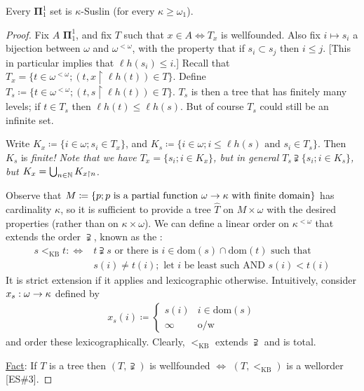 \documentclass[]{article}
\newcommand{\om}{\omega}
\newcommand{\lom}{{<\omega}}
\newcommand{\lh}{\ell h}
\newcommand{\bopi}{\bm{\Pi}}
\newcommand{\lkb}{<_{\textrm{KB}}}
\newcommand{\dom}{\textrm{dom}}
\begin{document}
\begin{theorem*}[Shoenfield]
    Every $\bopi^1_1$ set is $\kappa$-Suslin (for every $\kappa \ge \om_1$).
\end{theorem*}
\begin{proof}
    Fix $A$ $\bopi^1_1$, and fix $T$ such that $x \in A \iff T_x$ is wellfounded. Also fix $i \mapsto s_i$ a bijection between $\om$ and $\om^\lom$, with the property that if $s_i\subset s_j$ then $i\le j$. [This in particular implies that $\lh(s_i)\le i$.] Recall that $T_x = \{t \in \om^\lom; (t,x\restriction \lh(t))\in T\}$. Define $T_s \coloneqq \{t \in \om^\lom; (t,s\restriction \lh(t))\in T\}$. $T_s$ is then a tree that has finitely many levels; if $t\in T_s$ then $\lh(t)\le \lh(s)$. But of course $T_s$ could still be an infinite set.

    Write $K_x \coloneqq \{i \in \om; s_i \in T_x\}$, and $K_s \coloneqq \{i\in \om; i\le \lh(s)\textrm{ and }s_i \in T_s\}$. Then $K_s$ is \it{finite}! Note that we have $T_x = \{s_i;i\in K_x\}$, but in general $T_s\supsetneqq \{s_i;i\in K_s\}$, but $K_x = \bigcup_{n\in\mathbb{N}}K_{x\restriction n}$.

    Observe that $M \coloneqq \{p;p\textrm{ is a partial function }\om\ra\kappa\textrm{ with finite domain}\}$ has cardinality $\kappa$, so it is sufficient to provide a tree $\hat{T}$ on $M\times \om$ with the desired properties (rather than on $\kappa\times\om$). We can define a linear order on $\kappa^\lom$ that extends the order $\supsetneqq$, known as the :
    \begin{align*}
        s\lkb t :\iff& t\supsetneqq s\textrm{ or there is }i \in \dom(s)\cap\dom(t)\textrm{ such that }\\
        &s(i)\ne t(i);\textrm{ let }i\textrm{ be least such AND }s(i) < t(i)
    \end{align*}
    It is strict extension if it applies and lexicographic otherwise. Intuitively, consider $x_s : \om\ra \kappa$ defined by
    \begin{align*}
        x_s(i) \coloneqq \left\lbrace \begin{array}{cl}s(i) & i\in\dom(s)\\ \infty &\textrm{o/w} \end{array}\right.
    \end{align*}
    and order these lexicographically. Clearly, $\lkb$ extends $\supsetneqq$ and is total.

    \underline{Fact}: If $T$ is a tree then $(T,\supsetneqq)$ is wellfounded $\iff$ $(T,\lkb)$ is a wellorder [ES\#3].


\end{proof}
\end{document}
